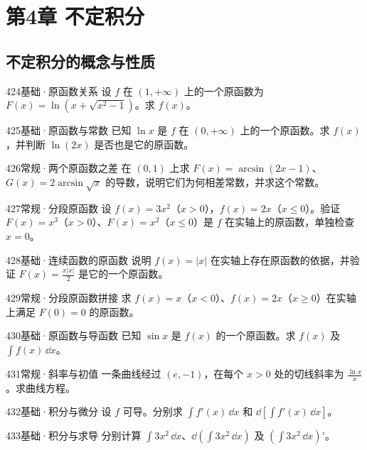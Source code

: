 \section{第4章 不定积分}
\subsection{不定积分的概念与性质}
\begin{exercise}{424}{基础·原函数关系}
设 $f$ 在 $(1,+\infty)$ 上的一个原函数为 $F(x)=\ln(x+\sqrt{x^2-1})$。求 $f(x)$。
\end{exercise}
\begin{exercise}{425}{基础·原函数与常数}
已知 $\ln x$ 是 $f$ 在 $(0,+\infty)$ 上的一个原函数。求 $f(x)$，并判断 $\ln(2x)$ 是否也是它的原函数。
\end{exercise}
\begin{exercise}{426}{常规·两个原函数之差}
在 $(0,1)$ 上求 $F(x)=\arcsin(2x-1)$、$G(x)=2\arcsin\sqrt x$ 的导数，说明它们为何相差常数，并求这个常数。
\end{exercise}
\begin{exercise}{427}{常规·分段原函数}
设 $f(x)=3x^2$（$x>0$），$f(x)=2x$（$x\le0$）。验证 $F(x)=x^3$（$x>0$）、$F(x)=x^2$（$x\le0$）是 $f$ 在实轴上的原函数，单独检查 $x=0$。
\end{exercise}
\begin{exercise}{428}{基础·连续函数的原函数}
说明 $f(x)=|x|$ 在实轴上存在原函数的依据，并验证 $F(x)=\frac{x|x|}{2}$ 是它的一个原函数。
\end{exercise}
\begin{exercise}{429}{常规·分段原函数拼接}
求 $f(x)=x$（$x<0$）、$f(x)=2x$（$x\ge0$）在实轴上满足 $F(0)=0$ 的原函数。
\end{exercise}
\begin{exercise}{430}{基础·原函数与导函数}
已知 $\sin x$ 是 $f(x)$ 的一个原函数。求 $f(x)$ 及 $\int f(x)\,\dd x$。
\end{exercise}
\begin{exercise}{431}{常规·斜率与初值}
一条曲线经过 $(e,-1)$，在每个 $x>0$ 处的切线斜率为 $\frac{\ln x}{x}$。求曲线方程。
\end{exercise}
\begin{exercise}{432}{基础·积分与微分}
设 $f$ 可导。分别求 $\int f'(x)\,\dd x$ 和 $\dd[\int f'(x)\,\dd x]$。
\end{exercise}
\begin{exercise}{433}{基础·积分与求导}
分别计算 $\int3x^2\,\dd x$、$\dd(\int3x^2\,\dd x)$ 及 $(\int3x^2\,\dd x)'$。
\end{exercise}
